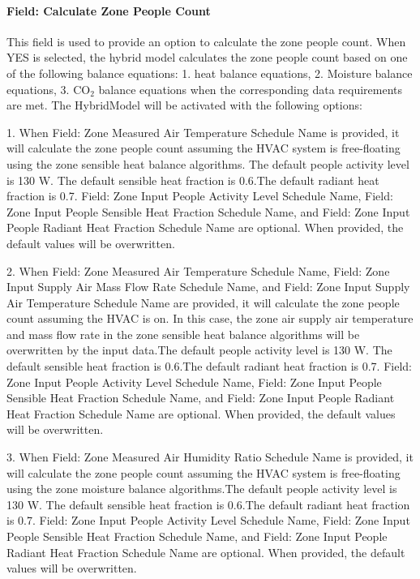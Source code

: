 \documentclass[11pt]{article}
\begin{document}
\paragraph{Field: Calculate Zone People Count}\label{field-calculate-zone-people-count-rate-hm}
This field is used to provide an option to calculate the zone people count.
When YES is selected, the hybrid model calculates the zone people count based on one of the following balance equations: 1. heat balance equations, 2. Moisture balance equations, 3. CO$_2$ balance equations when the corresponding data requirements are met. The HybridModel will be activated with the following options:


1. When Field: Zone Measured Air Temperature Schedule Name is provided, it will calculate the zone people count assuming the HVAC system is free-floating using the zone sensible heat balance algorithms. The default people activity level is 130 W. The default sensible heat fraction is 0.6.The default radiant heat fraction is 0.7. Field: Zone Input People Activity Level Schedule Name, Field: Zone Input People Sensible Heat Fraction Schedule Name, and Field: Zone Input People Radiant Heat Fraction Schedule Name are optional. When provided, the default values will be overwritten.

2. When Field: Zone Measured Air Temperature Schedule Name, Field: Zone Input Supply Air Mass Flow Rate Schedule Name, and Field: Zone Input Supply Air Temperature Schedule Name are provided, it will calculate the zone people count assuming the HVAC is on. In this case, the zone air supply air temperature and mass flow rate in the zone sensible heat balance algorithms will be overwritten by the input data.The default people activity level is 130 W. The default sensible heat fraction is 0.6.The default radiant heat fraction is 0.7. Field: Zone Input People Activity Level Schedule Name, Field: Zone Input People Sensible Heat Fraction Schedule Name, and Field: Zone Input People Radiant Heat Fraction Schedule Name are optional. When provided, the default values will be overwritten.

3. When Field: Zone Measured Air Humidity Ratio Schedule Name is provided, it will calculate the zone people count assuming the HVAC system is free-floating using the zone moisture balance algorithms.The default people activity level is 130 W. The default sensible heat fraction is 0.6.The default radiant heat fraction is 0.7. Field: Zone Input People Activity Level Schedule Name, Field: Zone Input People Sensible Heat Fraction Schedule Name, and Field: Zone Input People Radiant Heat Fraction Schedule Name are optional. When provided, the default values will be overwritten.
\end{document}
